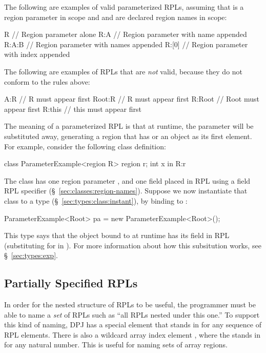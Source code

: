 The following are examples of valid parameterized RPLs, assuming that
 is a region parameter in scope and  and  are
declared region names in scope:
%
\begin{dpjlisting}
R      // Region parameter alone
R:A    // Region parameter with name appended
R:A:B  // Region parameter with names appended
R:[0]  // Region parameter with index appended
\end{dpjlisting}

The following are examples of RPLs that are \emph{not} valid, because
they do not conform to the rules above:
%
\begin{dpjlisting}
A:R      // R must appear first
Root:R   // R must appear first
R:Root   // Root must appear first
R:this   // this must appear first
\end{dpjlisting}

The meaning of a parameterized RPL is that at runtime, the parameter
will be substituted away, generating a region that has  or
an object as its first element.  For example, consider the following
class definition:
%
\begin{dpjlisting}
class ParameterExample<region R> {
  region r;
  int x in R:r
}
\end{dpjlisting}
%
The class  has one region parameter , and
one field  placed in RPL  using a field RPL specifier
(\S~\ref{sec:classes:region-names}).  Suppose we now instantiate that
class to a type (\S~\ref{sec:types:class:instant}), by binding
 to :
%
\begin{dpjlisting}
ParameterExample<Root> pa = new ParameterExample<Root>();
\end{dpjlisting}
%
This type says that the object bound to  at runtime has its
field  in RPL  (substituting  for 
in ).  For more information about how this subsitution works,
see \S~\ref{sec:types:exp}.

\subsection{Partially Specified RPLs%
\label{sec:rpls:partial}}

In order for the nested structure of RPLs to be useful, the programmer
must be able to name a \emph{set} of RPLs such as ``all RPLs nested
under this one.''  To support this kind of naming, DPJ has a special
element \kwd{*} that stands in for any sequence of RPL elements.
There is also a wildcard array index element \kwd{[?]}, where the
 stands in for any natural number.  This is useful for naming
sets of array regions.

